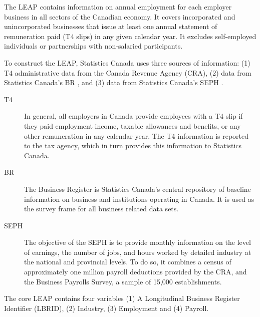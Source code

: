 
The \ac{LEAP} \citep{StatisticsCanada2019} contains information on annual employment for each employer business in all sectors of the Canadian economy. It covers incorporated and unincorporated businesses that issue at least one annual statement of remuneration paid (T4 slips) in any given calendar year. It excludes self-employed individuals or partnerships with non-salaried participants.

To construct the \ac{LEAP}, Statistics Canada uses three sources of information: (1) T4 administrative data  from the Canada Revenue Agency (CRA), (2) data from Statistics Canada's \acl{BR} \citep{StatisticsCanada2019a}, and (3) data from  Statistics Canada's \acf{SEPH} \citep{StatisticsCanada2019b}. 



\begin{description}
\item[T4] In general, all employers in Canada provide employees with a T4 slip if they paid employment income, taxable allowances and benefits, or any other remuneration in any calendar year. The T4 information is reported to the tax agency, which in turn provides this information to Statistics Canada. 

\item[BR] The Business Register is Statistics Canada's central repository of baseline information on business and institutions operating in Canada. It is used as the survey frame for all business related data sets.

\item[SEPH] The objective of the \ac{SEPH} is to provide monthly information on the level of earnings, the number of jobs, and hours worked by detailed industry at the national and provincial levels. To do so, it combines a census of approximately one million payroll deductions provided by the CRA, and the Business Payrolls Survey, a sample of 15,000 establishments.  
\end{description}
The core \ac{LEAP}  contains four variables (1) A Longitudinal Business Register Identifier (LBRID), (2) Industry, (3) Employment and (4) Payroll. 

